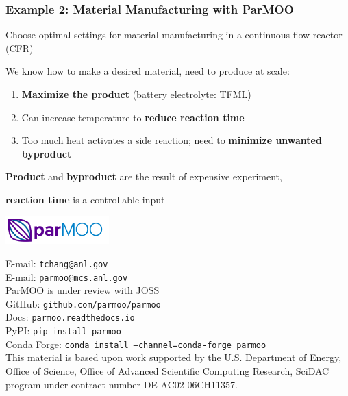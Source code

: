 \documentclass[aspectratio=169]{beamer}
\begin{document}
\begin{frame}\frametitle{Example 2: Material Manufacturing with ParMOO}
Choose optimal settings for material manufacturing in a
continuous flow reactor (CFR)

\bigskip

We know how to make a desired material, need to produce at scale:

\begin{enumerate}
\item {\color{green} \bf Maximize the product} (battery electrolyte: TFML)
\item Can increase temperature to {\bf \color{red} reduce reaction time}
\item Too much heat activates a side reaction; need to
{\bf \color{blue} minimize unwanted byproduct}
\end{enumerate}

\bigskip

{\color{green} \bf Product} and {\color{blue} \bf byproduct} are the result
of expensive experiment,

{\bf \color{red} reaction time} is a controllable input

\end{frame}

\begin{frame}
\begin{center}
\includegraphics[width=0.3\textwidth]{../img/logos/logo-parmoo.png}

\bigskip

{\large
E-mail: {\tt tchang@anl.gov}\\
E-mail: {\tt parmoo@mcs.anl.gov}\\
\bigskip
ParMOO is under review with JOSS\\
\bigskip
GitHub: {\tt github.com/parmoo/parmoo}\\
Docs: {\tt parmoo.readthedocs.io}\\
PyPI: {\tt pip install parmoo}\\
Conda Forge: {\tt conda install --channel=conda-forge parmoo}}\\
\bigskip
{\small This material is based upon work supported by the U.S. Department of Energy, Office of Science, Office of Advanced Scientific Computing Research, SciDAC program under contract number DE-AC02-06CH11357.}
\end{center}
\end{frame}
\end{document}
